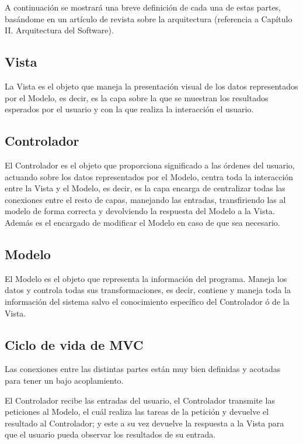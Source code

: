 A continuación se mostrará una breve definición de cada una de estas partes, basándome en un artículo de revista sobre la arquitectura (referencia a Capítulo II. Arquitectura del Software).

\subsection*{Vista}

La Vista es el objeto que maneja la presentación visual de los datos representados por el Modelo, es decir, es la capa sobre la que se muestran los resultados esperados por el usuario y con la que realiza la interacción el usuario.

\subsection*{Controlador}

El Controlador es el objeto que proporciona significado a las órdenes del usuario, actuando sobre los datos representados por el Modelo, centra toda la interacción entre la Vista y el Modelo, es decir, es la capa encarga de centralizar todas las conexiones entre el resto de capas, manejando las entradas, transfiriendo las al modelo de forma correcta y devolviendo la respuesta del Modelo a la Vista. Además es el encargado de modificar el Modelo en caso de que sea necesario.

\subsection*{Modelo}

El Modelo es el objeto que representa la información del programa. Maneja los datos y controla todas sus transformaciones, es decir, contiene y maneja toda la información del sistema salvo el conocimiento específico del Controlador ó de la Vista.

\subsection{Ciclo de vida de MVC}

Las conexiones entre las distintas partes están muy bien definidas y acotadas para tener un bajo acoplamiento.

El Controlador recibe las entradas del usuario, el Controlador transmite las peticiones al Modelo, el cuál realiza las tareas de la petición y devuelve el resultado al Controlador; y este a su vez devuelve la respuesta a la Vista para que el usuario pueda observar los resultados de su entrada.


